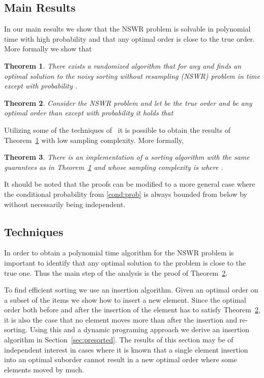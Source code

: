 \documentclass[11pt]{article}
\newtheorem{theorem}{Theorem}
\begin{document}
\subsection{Main Results}
In our main results we show that the NSWR problem is solvable in polynomial 
time with high probability and that any optimal order is close to the true 
order. More formally we show that

\begin{theorem} \label{thm:sort}
There exists a randomized algorithm that for any  and  finds 
an optimal solution to the noisy sorting without resampling (NSWR) problem 
in time  except with probability . 
\end{theorem}

\begin{theorem} \label{thm:dist}
Consider the NSWR problem and let  be the {\em true} order and 
 be any optimal order than except with probability  
it holds that 


\end{theorem}

Utilizing some of the techniques of~\cite{FPRU:90} 
it is possible to obtain the results of 
Theorem~\ref{thm:sort} with low sampling complexity. More formally, 
\begin{theorem} \label{thm:sampling}
There is an implementation of a sorting algorithm with the same guarantees 
as in Theorem~\ref{thm:sort} and whose sampling complexity is  
where . 
\end{theorem}

It should be noted that the proofs can be modified to a more general case
where the conditional probability from \eqref{cond:prob} is always bounded 
from below by  without necessarily being independent.

\subsection{Techniques}
In order to obtain a polynomial time algorithm for the NSWR problem is important to identify that any optimal solution to the problem is close to the true one. 
Thus the main step of the analysis is the proof of Theorem~\ref{thm:dist}.

To find efficient sorting we use an insertion algorithm. Given an optimal 
order on a subset of the items we show how to insert a new element. 
Since the optimal order both before and after the insertion of the element has 
to satisfy Theorem~\ref{thm:dist}, it is also the case that no element moves 
more than  after the insertion and re-sorting. 
Using this and a dynamic programing approach we derive an insertion algorithm 
in Section~\ref{sec:presorted}. The results of this section may be 
of independent interest in cases where it is known that a single element 
insertion into an optimal suborder cannot result in a new optimal order 
where some elements moved by much. 
\end{document}
